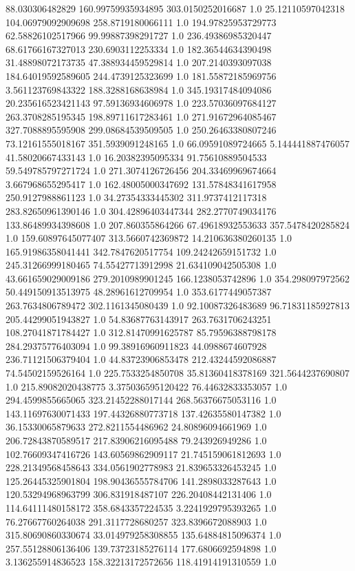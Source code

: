 88.030306482829	160.99759935934895	303.0150252016687	1.0
25.12110597042318	104.06979092909698	258.8719180066111	1.0
194.97825953729773	62.58826102517966	99.99887398291727	1.0
236.49386985320447	68.61766167327013	230.6903112253334	1.0
182.36544634390498	31.48898072173735	47.388934459529814	1.0
207.2140393097038	184.64019592589605	244.4739125323699	1.0
181.55872185969756	3.561123769843322	188.3288168638984	1.0
345.19317484094086	20.235616523421143	97.59136934606978	1.0
223.57036097684127	263.3708285195345	198.89711617283461	1.0
271.91672964085467	327.7088895595908	299.08684539509505	1.0
250.26463380807246	73.12161555018167	351.5939091248165	1.0
66.09591089724665	5.144441887476057	41.58020667433143	1.0
16.20382395095334	91.75610889504533	59.549785797271724	1.0
271.3074126726456	204.33469969674664	3.667968655295417	1.0
162.48005000347692	131.57848341617958	250.9127988861123	1.0
34.27354333445302	311.9737412117318	283.82650961390146	1.0
304.42896403447344	282.2770749034176	133.86489934398608	1.0
207.860355864266	67.49618932553633	357.5478420285824	1.0
159.60897645077407	313.5660742369872	14.210636380260135	1.0
165.91986358041441	342.7847620517754	109.24242659151732	1.0
245.31266999180465	74.55427713912998	21.634109042505308	1.0
43.661659029009186	279.2010989901245	166.1238053742896	1.0
354.298097972562	50.449150913513975	48.28961612709954	1.0
353.6177449057387	263.7634806789472	302.1161345080439	1.0
92.10087326483689	96.71831185927813	205.44299051943827	1.0
54.83687763143917	263.7631706243251	108.27041871784427	1.0
312.81470991625787	85.79596388798178	284.29375776403094	1.0
99.38916960911823	44.0988674607928	236.71121506379404	1.0
44.83723906853478	212.43244592086887	74.54502159526164	1.0
225.7533254850708	35.81360418378169	321.5644237690807	1.0
215.89082020438775	3.375036595120422	76.44632833353057	1.0
294.4599855665065	323.21452288017144	268.56376675053116	1.0
143.11697630071433	197.44326880773718	137.42635580147382	1.0
36.15330065879633	272.8211554486962	24.80896094661969	1.0
206.72843870589517	217.83906216095488	79.243926949286	1.0
102.76609347416726	143.60569862909117	21.745159061812693	1.0
228.21349568458643	334.0561902778983	21.839653326453245	1.0
125.26445325901804	198.90436555784706	141.2898033287643	1.0
120.53294968963799	306.831918487107	226.20408442131406	1.0
114.64111480158172	358.6843357224535	3.2241929795393265	1.0
76.27667760264038	291.3117728680257	323.8396672088903	1.0
315.80690860330674	33.014979258308855	135.64884815096374	1.0
257.55128806136406	139.73723185276114	177.6806692594898	1.0
3.136255914836523	158.32213172572656	118.41914191310559	1.0
